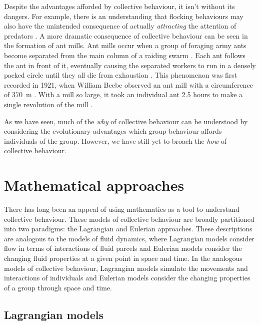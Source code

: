 Despite the advantages afforded by collective behaviour, it isn't without its
dangers. For example, there is an understanding that flocking behaviours may
also have the unintended consequence of actually \emph{attracting} the
attention of predators \parencite{wittenberger85}. A more dramatic consequence
of collective behaviour can be seen in the formation of ant mills. Ant mills
occur when a group of foraging army ants become separated from the main column
of a raiding swarm \parencite{schneirla44}. Each ant follows the ant in front
of it, eventually causing the separated workers to run in a densely packed
circle until they all die from exhaustion \parencite{schneirla71}. This
phenomenon was first recorded in 1921, when William Beebe observed an ant mill
with a circumference of \SI{370}{\metre} \parencite{beebe21}. With a mill so
large, it took an individual ant 2.5 hours to make a single revolution of the
mill \parencite{surowiecki05}.

As we have seen, much of the \emph{why} of collective behaviour can be
understood by considering the evolutionary advantages which group behaviour
affords individuals of the group. However, we have still yet to broach the
\emph{how} of collective behaviour.

\section{Mathematical approaches}
\label{sec:models}

There has long been an appeal of using mathematics as a tool to understand
collective behaviour. These models of collective behaviour are broadly
partitioned into two paradigms: the Lagrangian and Eulerian approaches. These
descriptions are analogous to the models of fluid dynamics, where Lagrangian
models consider flow in terms of interactions of fluid parcels and Eulerian
models consider the changing fluid properties at a given point in space and
time. In the analogous models of collective behaviour, Lagrangian models
simulate the movements and interactions of individuals and Eulerian models
consider the changing properties of a group through space and time.

\subsection{Lagrangian models} \label{ssec:lagrangian_models}

